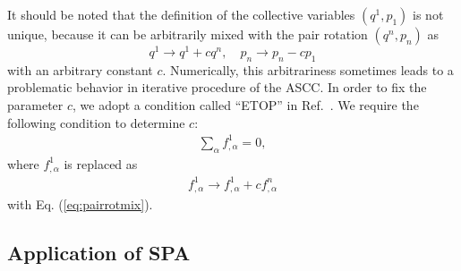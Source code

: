 \documentclass[11pt]{book} %
\begin{document}

It should be noted \cite{N2012} that the definition of the collective
variables $(q^1,p_1)$ is not unique, because it can be arbitrarily mixed
with the pair rotation $(q^n,p_n)$ as
\begin{equation}
	q^1 \rightarrow q^1 + c q^n,  \quad
	p_n \rightarrow p_n -c p_1 \label{eq:pairrotmix}
\end{equation}
with an arbitrary constant $c$.
Numerically, this arbitrariness sometimes leads to a problematic behavior 
in iterative procedure of the ASCC.
In order to fix the parameter $c$, we adopt a condition
called ``ETOP'' in Ref.~\cite{HNMM07}.
We require the following condition to determine $c$:
\begin{align}
\sum_\alpha 
	f^1_{,\alpha} = 0 ,
\end{align}
where $f^1_{,\alpha}$ is replaced as
\begin{align}
{f}^1_{,\alpha} \to f^1_{,\alpha} + c f^n_{,\alpha}
  \label{f}
\end{align}
with Eq. (\ref{eq:pairrotmix}).


\subsection{Application of SPA}
\end{document}
